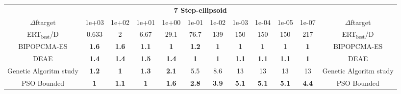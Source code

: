 \begin{tabular}{cccccccccccc}
 & \multicolumn{10}{c}{{\normalsize \textbf{7 Step-ellipsoid}}}\\
$\Delta$ftarget& 1e+03& 1e+02& 1e+01& 1e+00& 1e-01& 1e-02& 1e-03& 1e-04& 1e-05& 1e-07 & $\Delta$ftarget \\
ERT$_{\textrm{best}}$/D& 0.633& 2& 6.67& 29.1& 76.7& 139& 150& 150& 150& 217 & ERT$_{\textrm{best}}$/D \\
\hline
BIPOPCMA-ES & \textbf{1.6} & \textbf{1.6} & \textbf{1.1} & \textbf{1} & \textbf{1.2} & \textbf{1} & \textbf{1} & \textbf{1} & \textbf{1} & \textbf{1} & BIPOPCMA-ES \cite{add_an_entry_for_BIPOPCMA-ES_in_bbob.bib}\\
DEAE & \textbf{1.4} & \textbf{1.4} & \textbf{1.5} & \textbf{1.4} & \textbf{1} & \textbf{1} & \textbf{1.1} & \textbf{1.1} & \textbf{1.1} & \textbf{1} & DEAE \cite{add_an_entry_for_DEAE_in_bbob.bib}\\
Genetic Algoritm study & \textbf{1.2} & \textbf{1} & \textbf{1.3} & \textbf{2.1} & 5.5 & 8.6 & 13 & 13 & 13 & 13 & Genetic Algoritm study \cite{add_an_entry_for_Genetic Algoritm study_in_bbob.bib}\\
PSO Bounded & \textbf{1} & \textbf{1.1} & \textbf{1} & \textbf{1.6} & \textbf{2.8} & \textbf{3.9} & \textbf{5.1} & \textbf{5.1} & \textbf{5.1} & \textbf{4.4} & PSO Bounded \cite{add_an_entry_for_PSO Bounded_in_bbob.bib}
\end{tabular}
